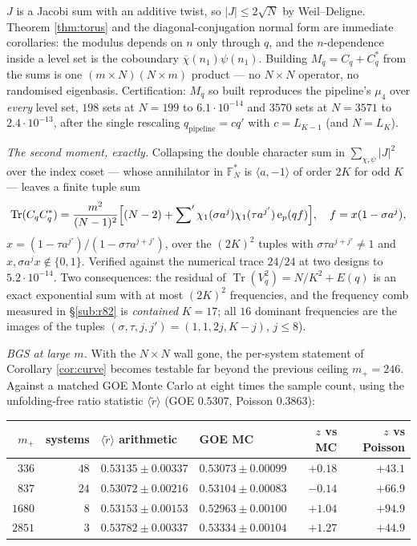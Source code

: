 \documentclass[11pt,reqno]{amsart}
\theoremstyle{definition}
\newcommand{\FF}{\mathbb{F}}
\newcommand{\ep}{\mathrm{e}_p}
\begin{document}
$J$ is a Jacobi sum with an additive twist, so $|J|\le2\sqrt N$ by
Weil--Deligne.  Theorem \ref{thm:torus} and the diagonal-conjugation normal form
are immediate corollaries: the modulus depends on $n$ only through $q$, and the
$n$-dependence inside a level set is the coboundary
$\overline{\chi}(n_1)\psi(n_1)$.  Building $M_q=C_q+C_q^{*}$ from the sums is one
$(m\times N)(N\times m)$ product --- no $N\times N$ operator, no randomised
eigenbasis.  Certification: $M_q$ so built reproduces the pipeline's $\mu_4$ over
\emph{every} level set, $198$ sets at $N=199$ to $6.1\cdot10^{-14}$ and $3570$
sets at $N=3571$ to $2.4\cdot10^{-13}$, after the single rescaling
$q_{\mathrm{pipeline}}=cq'$ with $c=L_{K-1}$ (and $N=L_K$).

\emph{The second moment, exactly.}  Collapsing the double character sum in
$\sum_{\chi,\psi}|J|^2$ over the index coset --- whose annihilator in $\FF_N^*$
is $\langle a,-1\rangle$ of order $2K$ for odd $K$ --- leaves a finite tuple sum
\[
  \operatorname{Tr}(C_qC_q^{*})
  =\frac{m^2}{(N-1)^2}\Bigl[(N-2)
    +\sum\nolimits'\chi_1(\sigma a^j)\chi_1(\tau a^{j'})\,\ep(qf)\Bigr],
  \quad f=x(1-\sigma a^j),
\]
$x=(1-\tau a^{j'})/(1-\sigma\tau a^{j+j'})$, over the $(2K)^2$ tuples with
$\sigma\tau a^{j+j'}\neq1$ and $x,\sigma a^jx\notin\{0,1\}$.  Verified against
the numerical trace $24/24$ at two designs to $5.2\cdot10^{-14}$.  Two
consequences: the residual of $\operatorname{Tr}(V_q^2)=N/K^2+E(q)$ is an exact
exponential sum with at most $(2K)^2$ frequencies, and the frequency comb
measured in \S\ref{sub:r82} is \emph{contained}
$K=17$; all $16$ dominant frequencies are the images of the tuples
$(\sigma,\tau,j,j')=(1,1,2j,K-j)$, $j\le8$).

\emph{BGS at large $m$.}  With the $N\times N$ wall gone, the per-system
statement of Corollary \ref{cor:curve} becomes testable far beyond the previous
ceiling $m_+=246$.  Against a matched GOE Monte Carlo at eight times the sample
count, using the unfolding-free ratio statistic $\langle\tilde r\rangle$
(GOE $0.5307$, Poisson $0.3863$):

\begin{center}\small
\begin{tabular}{rrllrr}
\toprule
$m_+$ & systems & $\langle\tilde r\rangle$ arithmetic & GOE MC & $z$ vs MC & $z$ vs Poisson\\
\midrule
$336$ & $48$ & $0.53135\pm0.00337$ & $0.53073\pm0.00099$ & $+0.18$ & $+43.1$\\
$837$ & $24$ & $0.53072\pm0.00216$ & $0.53104\pm0.00083$ & $-0.14$ & $+66.9$\\
$1680$ & $8$ & $0.53153\pm0.00153$ & $0.52963\pm0.00100$ & $+1.04$ & $+94.9$\\
$2851$ & $3$ & $0.53782\pm0.00337$ & $0.53334\pm0.00104$ & $+1.27$ & $+44.9$\\
\bottomrule
\end{tabular}
\end{center}
\end{document}
